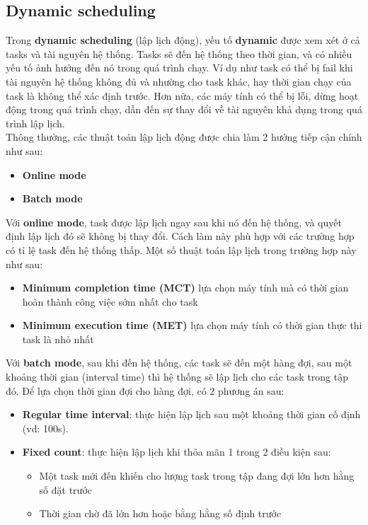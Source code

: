 \documentclass{my_style}
\begin{document}
\subsection{Dynamic scheduling}
\label{dynamic_scheduling}
Trong \textbf{dynamic scheduling} (lập lịch động), yếu tố \textbf{dynamic} được xem xét ở cả tasks và tài nguyên hệ thống. 
Tasks sẽ đến hệ thống theo thời gian, và có nhiều yếu tố ảnh hưởng đến nó trong quá trình chạy. Ví dụ như task có thể bị fail khi tài nguyên hệ thống không đủ và nhường cho task khác, hay thời gian chạy của task là không thể xác định trước. Hơn nữa, các máy tính có thể bị lỗi, dừng hoạt động trong quá trình chạy, dẫn đến sự thay đổi về tài nguyên khả dụng trong quá trình lập lịch. \\
Thông thường, các thuật toán lập lịch động được chia làm 2 hướng tiếp cận chính\cite{15} như sau: 
\begin{itemize}
	\item \textbf{Online mode}
	\item \textbf{Batch mode}
\end{itemize}
Với \textbf{online mode}, task được lập lịch ngay sau khi nó đến hệ thống, và quyết định lập lịch đó sẽ không bị thay đổi. Cách làm này phù hợp với các trường hợp có tỉ lệ task đến hệ thống thấp\cite{16}. Một số thuật toán lập lịch trong trường hợp này như sau: 
\begin{itemize}
	\item \textbf{Minimum completion time (MCT)} lựa chọn máy tính mà có thời gian hoàn thành công việc sớm nhất cho task
	\item \textbf{Minimum execution time (MET)} lựa chọn máy tính có thời gian thực thi task là nhỏ nhất
\end{itemize}
Với \textbf{batch mode}, sau khi đến hệ thống,  các task sẽ đến một hàng đợi, sau một khoảng thời gian (interval time) thì hệ thống sẽ lập lịch cho các task trong tập đó. Để lựa chọn thời gian đợi cho hàng đợi, có 2 phương án sau: 
\begin{itemize}
	\item \textbf{Regular time interval}: thực hiện lập lịch sau một khoảng thời gian cố định (vd: 100s).
	\item \textbf{Fixed count}: thực hiện lập lịch khi thỏa mãn 1 trong 2 điều kiện sau: 
	\begin{itemize}
		 \item Một task mới đến khiến cho lượng task trong tập đang đợi lớn hơn hằng số đặt trước
		 \item Thời gian chờ đã lớn hơn hoặc bằng hằng số định trước
	\end{itemize}
\end{itemize}
\end{document}
